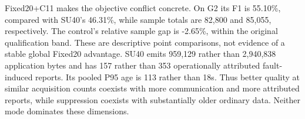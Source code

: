 Fixed20+C11 makes the objective conflict concrete. On G2 its F1 is 55.10\%, compared with SU40's 46.31\%, while sample totals are 82,800 and 85,055, respectively. The control's relative sample gap is -2.65\%, within the original qualification band. These are descriptive point comparisons, not evidence of a stable global Fixed20 advantage. SU40 emits 959,129 rather than 2,940,838 application bytes and has 157 rather than 353 operationally attributed fault-induced reports. Its pooled P95 age is 113 rather than 18s. Thus better quality at similar acquisition counts coexists with more communication and more attributed reports, while suppression coexists with substantially older ordinary data. Neither mode dominates these dimensions.
